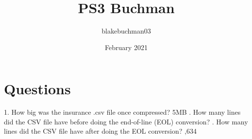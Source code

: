 \documentclass{article}
\title{PS3 Buchman}
\author{blakebuchman03 }
\date{February 2021}
\begin{document}
\maketitle

\section{Questions}
1. How big was the insurance .csv file once compressed? 
\newline 5MB
\newline
{}. How many lines did the CSV file have before doing the end-of-line (EOL) conversion?
\newline
{}. How many lines did the CSV file have after doing the EOL conversion? 
,634
\end{document}
